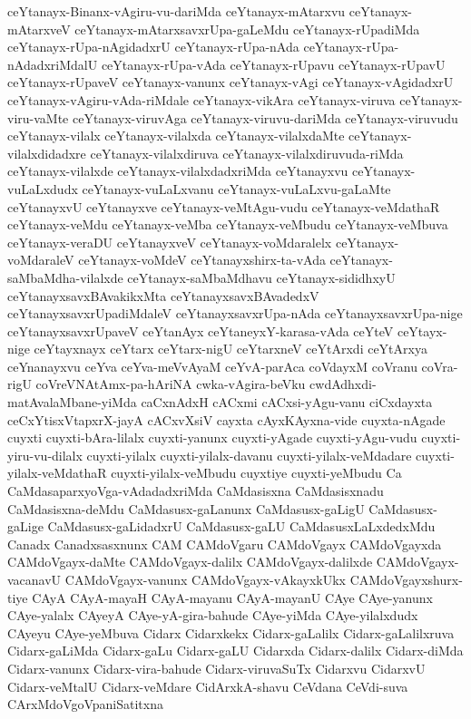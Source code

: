 {ceYtanayx-Binanx-vAgiru-vu-dariMda
ceYtanayx-mAtarxvu
ceYtanayx-mAtarxveV
ceYtanayx-mAtarxsavxrUpa-gaLeMdu
ceYtanayx-rUpadiMda
ceYtanayx-rUpa-nAgidadxrU
ceYtanayx-rUpa-nAda
ceYtanayx-rUpa-nAdadxriMdalU
ceYtanayx-rUpa-vAda
ceYtanayx-rUpavu
ceYtanayx-rUpavU
ceYtanayx-rUpaveV
ceYtanayx-vanunx
ceYtanayx-vAgi
ceYtanayx-vAgidadxrU
ceYtanayx-vAgiru-vAda-riMdale
ceYtanayx-vikAra
ceYtanayx-viruva
ceYtanayx-viru-vaMte
ceYtanayx-viruvAga
ceYtanayx-viruvu-dariMda
ceYtanayx-viruvudu
ceYtanayx-vilalx
ceYtanayx-vilalxda
ceYtanayx-vilalxdaMte
ceYtanayx-vilalxdidadxre
ceYtanayx-vilalxdiruva
ceYtanayx-vilalxdiruvuda-riMda
ceYtanayx-vilalxde
ceYtanayx-vilalxdadxriMda
ceYtanayxvu
ceYtanayx-vuLaLxdudx
ceYtanayx-vuLaLxvanu
ceYtanayx-vuLaLxvu-gaLaMte
ceYtanayxvU
ceYtanayxve
ceYtanayx-veMtAgu-vudu
ceYtanayx-veMdathaR
ceYtanayx-veMdu
ceYtanayx-veMba
ceYtanayx-veMbudu
ceYtanayx-veMbuva
ceYtanayx-veraDU
ceYtanayxveV
ceYtanayx-voMdaralelx
ceYtanayx-voMdaraleV
ceYtanayx-voMdeV
ceYtanayxshirx-ta-vAda
ceYtanayx-saMbaMdha-vilalxde
ceYtanayx-saMbaMdhavu
ceYtanayx-sididhxyU
ceYtanayxsavxBAvakikxMta
ceYtanayxsavxBAvadedxV
ceYtanayxsavxrUpadiMdaleV
ceYtanayxsavxrUpa-nAda
ceYtanayxsavxrUpa-nige
ceYtanayxsavxrUpaveV
ceYtanAyx
ceYtaneyxY-karasa-vAda
ceYteV
ceYtayx-nige
ceYtayxnayx
ceYtarx
ceYtarx-nigU
ceYtarxneV
ceYtArxdi
ceYtArxya
ceYnanayxvu
ceYva
ceYva-meVvAyaM
ceYvA-parAca
coVdayxM
coVranu
coVra-rigU
coVreVNAtAmx-pa-hAriNA
cwka-vAgira-beVku
cwdAdhxdi-matAvalaMbane-yiMda
caCxnAdxH
cACxmi
cACxsi-yAgu-vanu
ciCxdayxta
ceCxYtisxVtapxrX-jayA
cACxvXsiV
cayxta
cAyxKAyxna-vide
cuyxta-nAgade
cuyxti
cuyxti-bAra-lilalx
cuyxti-yanunx
cuyxti-yAgade
cuyxti-yAgu-vudu
cuyxti-yiru-vu-dilalx
cuyxti-yilalx
cuyxti-yilalx-davanu
cuyxti-yilalx-veMdadare
cuyxti-yilalx-veMdathaR
cuyxti-yilalx-veMbudu
cuyxtiye
cuyxti-yeMbudu
Ca
CaMdasaparxyoVga-vAdadadxriMda
CaMdasisxna
CaMdasisxnadu
CaMdasisxna-deMdu
CaMdasusx-gaLanunx
CaMdasusx-gaLigU
CaMdasusx-gaLige
CaMdasusx-gaLidadxrU
CaMdasusx-gaLU
CaMdasusxLaLxdedxMdu
Canadx
Canadxsasxnunx
CAM
CAMdoVgaru
CAMdoVgayx
CAMdoVgayxda
CAMdoVgayx-daMte
CAMdoVgayx-dalilx
CAMdoVgayx-dalilxde
CAMdoVgayx-vacanavU
CAMdoVgayx-vanunx
CAMdoVgayx-vAkayxkUkx
CAMdoVgayxshurx-tiye
CAyA
CAyA-mayaH
CAyA-mayanu
CAyA-mayanU
CAye
CAye-yanunx
CAye-yalalx
CAyeyA
CAye-yA-gira-bahude
CAye-yiMda
CAye-yilalxdudx
CAyeyu
CAye-yeMbuva
Cidarx
Cidarxkekx
Cidarx-gaLalilx
Cidarx-gaLalilxruva
Cidarx-gaLiMda
Cidarx-gaLu
Cidarx-gaLU
Cidarxda
Cidarx-dalilx
Cidarx-diMda
Cidarx-vanunx
Cidarx-vira-bahude
Cidarx-viruvaSuTx
Cidarxvu
CidarxvU
Cidarx-veMtalU
Cidarx-veMdare
CidArxkA-shavu
CeVdana
CeVdi-suva
CArxMdoVgoVpaniSatitxna
}
